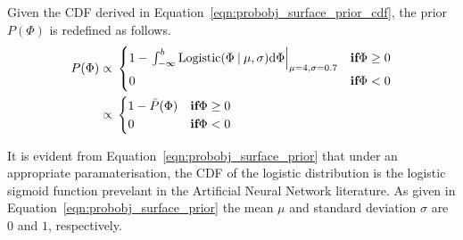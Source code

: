 Given the CDF derived in Equation~\ref{eqn:probobj_surface_prior_cdf}, 
the prior \( P(\Phi) \) is redefined as follows.
\begin{align}
  \label{eqn:probobj_surface_prior}
  P(\Phi) \propto{}& 
  \begin{cases}
    1 - \left. 
    \int_{-\infty}^{b} \text{Logistic}(\Phi \:\vert\: \mu, \sigma) {\mathrm d{\Phi}}
    \right\rvert_{\mu = 4, \sigma = 0.7} & \textbf{if} \Phi \geq 0\\
    0 & \textbf{if} \Phi < 0
  \end{cases}\\
  \propto{}&
  \begin{cases}
    1 - \bar{P}(\Phi) & \textbf{if} \Phi \geq 0\\
    0 & \textbf{if} \Phi < 0
  \end{cases}
\end{align}

It is evident from Equation~\ref{eqn:probobj_surface_prior} that under an 
appropriate paramaterisation, the CDF of the logistic distribution is the 
logistic sigmoid function prevelant in the Artificial Neural Network literature. 
As given in Equation~\ref{eqn:probobj_surface_prior} the mean \( \mu \) and standard 
deviation \( \sigma \) are \(0\) and \(1\), respectively.

